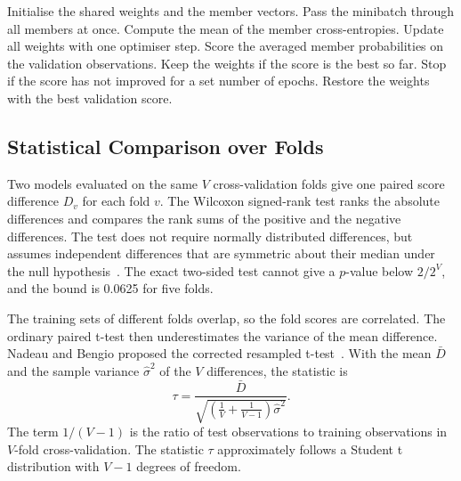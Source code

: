 \documentclass[conference]{IEEEtran}
\begin{document}
\begin{algorithm}[!t]
    \caption{Training of TabM with early stopping}
    \label{alg:tabm}
    \begin{algorithmic}[1]
        \STATE Initialise the shared weights and the member vectors.
        \STATE Pass the minibatch through all members at once.
        \STATE Compute the mean of the member cross-entropies.
        \STATE Update all weights with one optimiser step.
        \ENDFOR
        \STATE Score the averaged member probabilities on the validation observations.
        \STATE Keep the weights if the score is the best so far.
        \STATE Stop if the score has not improved for a set number of epochs.
        \ENDFOR
        \STATE Restore the weights with the best validation score.
    \end{algorithmic}
\end{algorithm}

\subsection{Statistical Comparison over Folds}
Two models evaluated on the same $V$ cross-validation folds give one paired score difference $D_v$ for each fold $v$. The Wilcoxon signed-rank test ranks the absolute differences and compares the rank sums of the positive and the negative differences. The test does not require normally distributed differences, but assumes independent differences that are symmetric about their median under the null hypothesis~\cite{wilcoxon1945}. The exact two-sided test cannot give a $p$-value below $2/2^{V}$, and the bound is 0.0625 for five folds.

The training sets of different folds overlap, so the fold scores are correlated. The ordinary paired t-test then underestimates the variance of the mean difference. Nadeau and Bengio proposed the corrected resampled t-test~\cite{nadeau2003}. With the mean $\bar{D}$ and the sample variance $\hat{\sigma}^2$ of the $V$ differences, the statistic is
\begin{equation}
    \tau = \frac{\bar{D}}{\sqrt{\left(\frac{1}{V} + \frac{1}{V-1}\right)\hat{\sigma}^2}}.
\end{equation}
The term $1/(V-1)$ is the ratio of test observations to training observations in $V$-fold cross-validation. The statistic $\tau$ approximately follows a Student t distribution with $V-1$ degrees of freedom.
\end{document}
